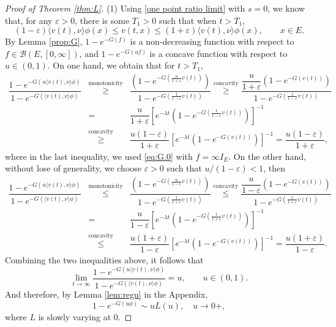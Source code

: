 \documentclass[12pt,a4paper]{amsart}
\numberwithin{equation}{section}
\theoremstyle{plain}
\theoremstyle{definition}
\theoremstyle{remark}
\begin{document}
\begin{proof}[Proof of Theorem \ref{thm:L}]
(1) Using \eqref{one point ratio limit} with $s=0$, we know that, for any $\varepsilon>0$, there is some $T_1>0$ such that when $t>T_1$,
\[
(1-\varepsilon)\langle v(t),\nu\rangle \phi(x)\leq v(t,x)\leq (1+\varepsilon)\langle v(t),\nu\rangle \phi(x),\qquad x\in E.
\]
By Lemma \ref{prop:G},  $1-e^{-G(f)}$ is a non-decreasing function with respect to $f\in \mathcal B(E,[0,\infty])$, and $1-e^{-G(uf)}$ is a concave function with respect to $u\in(0,1)$.
On one hand, we obtain that for $t>T_1$,
\begin{eqnarray}\label{lower}
\dfrac{1-e^{-G(u\langle v(t),\nu\rangle \phi)}}{1-e^{-G(\langle v(t),\nu\rangle \phi)}}&\overset{\text{monotonicity}}\geq& \dfrac{\left(1-e^{-G(\frac{u}{1+\varepsilon}v(t))}\right)}{1-e^{-G(\frac{1}{1-\varepsilon} v(t))}}
\overset{\text{concavity}}\geq \dfrac{\dfrac{u}{1+\varepsilon}\left(1-e^{-G(v(t))}\right)}{1-e^{-G(\frac{1}{1-\varepsilon} v(t))}}
\\
&=&\dfrac{u}{1+\varepsilon}\left[e^{-\lambda t}\left(1-e^{-G(\frac{1}{1-\varepsilon} v(t))}\right)\right]^{-1}\nonumber\\
&\overset{\text{concavity}}\geq& \dfrac{u(1-\varepsilon)}{1+\varepsilon}\left[e^{-\lambda t}\left(1-e^{-G(v(t))}\right)\right]^{-1}=\dfrac{u(1-\varepsilon)}{1+\varepsilon},
\end{eqnarray}
where in the last inequality, we used \eqref{eq:G.0} with $f=\infty I_{E}.$
On the other hand, without lose of generality, we choose $\varepsilon>0$ such that $u/(1-\varepsilon)<1$, then
\begin{eqnarray}\label{upper}
\dfrac{1-e^{-G(u\langle v(t),\nu\rangle \phi)}}{1-e^{-G(\langle v(t),\nu\rangle \phi)}}&\overset{\text{monotonicity}}\leq &\dfrac{\left(1-e^{-G(\frac{u}{1-\epsilon}v(t))}\right)}{1-e^{-G(\frac{1}{1+\varepsilon} v(t))}}\overset{\text{concavity}}\leq \dfrac{\dfrac{u}{1-\varepsilon}\left(1-e^{-G(v(t))}\right)}{1-e^{-G(\frac{1}{1+\varepsilon} v(t))}}\\
&=&\dfrac{u}{1-\varepsilon}\left[e^{-\lambda t}\left(1-e^{-G(\frac{1}{1+\varepsilon} v(t))}\right)\right]^{-1}\\
 &\overset{\text{concavity}}\leq& \dfrac{u(1+\varepsilon)}{1-\varepsilon}\left[e^{-\lambda t}\left(1-e^{-G(v(t))}\right)\right]^{-1}
=\dfrac{u(1+\varepsilon)}{1-\varepsilon}.
\end{eqnarray}
Combining the two inequalities above, it follows that
\[
\lim_{t\to\infty}\dfrac{1-e^{-G(u\langle v(t),\nu\rangle \phi)}}{1-e^{-G(\langle v(t),\nu\rangle \phi)}}=u,\qquad u\in (0,1).
\]
And therefore, by Lemma \ref{lem:regu} in the Appendix, 
\begin{equation}\label{eq regu}
1-e^{-G(u\phi)}\sim uL(u),\quad u\rightarrow 0+,
\end{equation}
where $L$ is slowly varying at $0$.


\end{proof}
\end{document}
